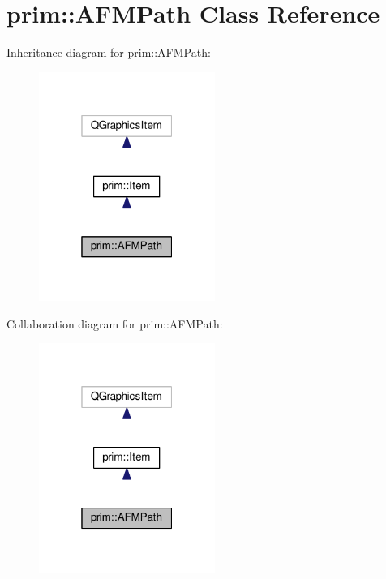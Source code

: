 \hypertarget{classprim_1_1AFMPath}{}\section{prim\+:\+:A\+F\+M\+Path Class Reference}
\label{classprim_1_1AFMPath}


Inheritance diagram for prim\+:\+:A\+F\+M\+Path\+:\nopagebreak
\begin{figure}[H]
\begin{center}
\leavevmode
\includegraphics[width=163pt]{classprim_1_1AFMPath__inherit__graph}
\end{center}
\end{figure}


Collaboration diagram for prim\+:\+:A\+F\+M\+Path\+:\nopagebreak
\begin{figure}[H]
\begin{center}
\leavevmode
\includegraphics[width=163pt]{classprim_1_1AFMPath__coll__graph}
\end{center}
\end{figure}

